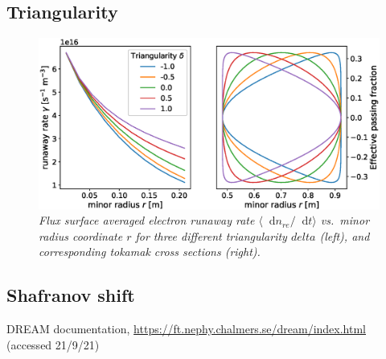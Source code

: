 \documentclass[11pt,a4paper]{article}
\newcommand*\diff{\mathop{}\!\mathrm{d}}
\begin{document}
\subsection{Triangularity}
\begin{figure}[H]
    \centering
    \includegraphics[width=\textwidth]{figs/triangularity.eps}
    \caption{\textit{Flux surface averaged electron runaway rate $\langle\diff{n}_{re}/\diff{t}\rangle$ vs.\ minor radius coordinate $r$ for three different triangularity $delta$ (left), and corresponding tokamak cross sections (right).}}
    \label{fig:elongation}
\end{figure}

\subsection{Shafranov shift}


\begin{thebibliography}{100}
    DREAM documentation, \url{https://ft.nephy.chalmers.se/dream/index.html} (accessed 21/9/21)

\end{thebibliography}
\end{document}
